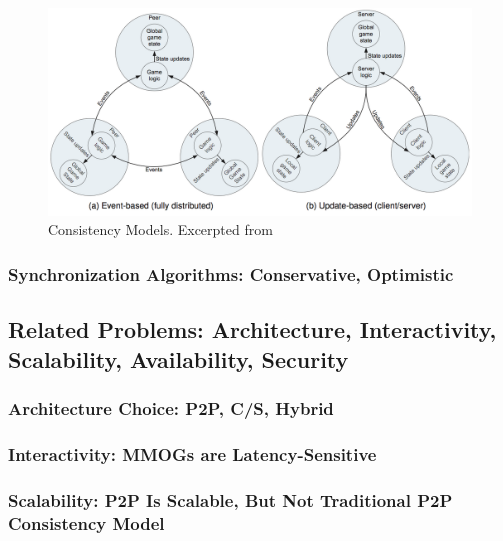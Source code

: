 \documentclass{article}
\begin{document}
\begin{figure}
\begin{center}
\includegraphics[scale=0.3]{images/cm.png}
\caption{Consistency Models. Excerpted from \cite{Gilmore12}}
\label{default}
\end{center}
\end{figure}

\subsubsection{Synchronization Algorithms: Conservative, Optimistic}

\subsection{Related Problems: Architecture, Interactivity, Scalability, Availability, Security}
\label{sec:rp}

\subsubsection{Architecture Choice: P2P, C/S, Hybrid}

\subsubsection{Interactivity: MMOGs are Latency-Sensitive}

\subsubsection{Scalability: P2P Is Scalable, But Not Traditional P2P Consistency Model}
\end{document}
